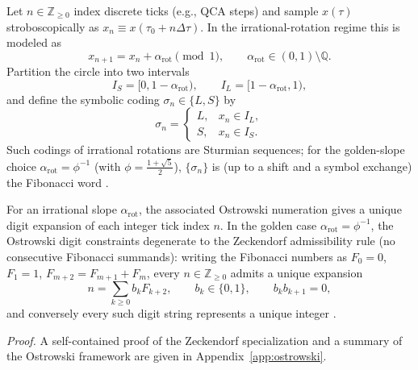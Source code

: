 \begin{definition}
Let $n\in\mathbb{Z}_{\ge 0}$ index discrete ticks (e.g., QCA steps) and sample $x(\tau)$ stroboscopically as $x_n\equiv x(\tau_0+n\Delta\tau)$. In the irrational-rotation regime this is modeled as
\begin{equation}
    x_{n+1}=x_n+\alpha_{\mathrm{rot}} \pmod 1,\qquad \alpha_{\mathrm{rot}}\in(0,1)\setminus\mathbb{Q}.
\end{equation}
Partition the circle into two intervals
\begin{equation}
    I_S=[0,1-\alpha_{\mathrm{rot}}),\qquad I_L=[1-\alpha_{\mathrm{rot}},1),
\end{equation}
and define the symbolic coding $\sigma_n\in\{L,S\}$ by
\begin{equation}
    \sigma_n=
    \begin{cases}
    L,& x_n\in I_L,\\
    S,& x_n\in I_S.
    \end{cases}
\end{equation}
Such codings of irrational rotations are Sturmian sequences; for the golden-slope choice $\alpha_{\mathrm{rot}}=\phi^{-1}$ (with $\phi=\tfrac{1+\sqrt5}{2}$), $\{\sigma_n\}$ is (up to a shift and a symbol exchange) the Fibonacci word \cite{MorseHedlund1940,Lothaire2002}.
\end{definition}

\begin{proposition}
\label{prop:ostrowski_zeckendorf}
For an irrational slope $\alpha_{\mathrm{rot}}$, the associated Ostrowski numeration gives a unique digit expansion of each integer tick index $n$. In the golden case $\alpha_{\mathrm{rot}}=\phi^{-1}$, the Ostrowski digit constraints degenerate to the Zeckendorf admissibility rule (no consecutive Fibonacci summands): writing the Fibonacci numbers as $F_0=0$, $F_1=1$, $F_{m+2}=F_{m+1}+F_m$, every $n\in\mathbb{Z}_{\ge 0}$ admits a unique expansion
\begin{equation}
    n=\sum_{k\ge 0} b_k F_{k+2},\qquad b_k\in\{0,1\},\qquad b_k b_{k+1}=0,
\end{equation}
and conversely every such digit string represents a unique integer \cite{Zeckendorf1972,AlloucheShallit2003}.
\end{proposition}
\noindent\textit{Proof.} A self-contained proof of the Zeckendorf specialization and a summary of the Ostrowski framework are given in Appendix~\ref{app:ostrowski}.

